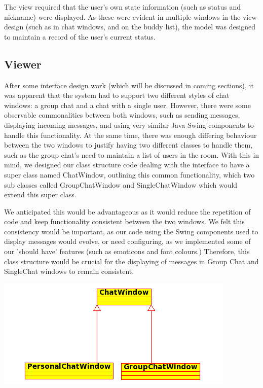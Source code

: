 The view required that the user's own state information (such as status and nickname) were displayed. As these were evident in multiple windows in the view design (such as in chat windows, and on the buddy list), the model was designed to maintain a record of the user's current status. 

\subsection {Viewer}

After some interface design work (which will be discussed in coming sections), it was apparent that the system had to support two different styles of chat windows: a group chat and a chat with a single user. However, there were some observable commonalities between both windows, such as sending messages, displaying incoming messages, and using very similar Java Swing components to handle this functionality. At the same time, there was enough differing behaviour between the two windows to justify having two different classes to handle them, such as the group chat's need to maintain a list of users in the room. With this in mind, we designed our class structure code dealing with the interface to have a super class named ChatWindow, outlining this common functionality, which two sub classes called GroupChatWindow and SingleChatWindow which would extend this super class. 

We anticipated this would be advantageous as it would reduce the repetition of code and keep functionality consistent between the two windows. We felt this consistency would be important, as our code using the Swing components used to display messages would evolve, or need configuring, as we implemented some of our 'should have' features (such as emoticons and font colours.) Therefore, this class structure would be crucial for the displaying of messages in Group Chat and SingleChat windows to remain consistent.

\includegraphics[scale=0.65]{Design/diagrams/chatwin.png}


